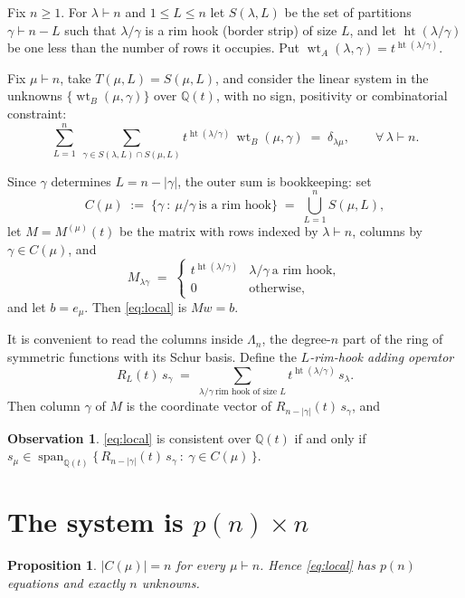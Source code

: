 \documentclass[11pt]{article}
\newtheorem{proposition}[theorem]{Proposition}
\theoremstyle{definition}
\newtheorem{observation}[theorem]{Observation}
\newcommand{\Q}{\mathbb{Q}}
\newcommand{\hgt}{\operatorname{ht}}      %
\newcommand{\wtA}{\operatorname{wt}_A}
\newcommand{\wtB}{\operatorname{wt}_B}
\newcommand{\Lam}{\Lambda}
\begin{document}
Fix $n\ge1$. For $\lambda\vdash n$ and $1\le L\le n$ let $S(\lambda,L)$ be the set of
partitions $\gamma\vdash n-L$ such that $\lambda/\gamma$ is a rim hook (border strip) of size
$L$, and let $\hgt(\lambda/\gamma)$ be one less than the number of rows it occupies. Put
$\wtA(\lambda,\gamma)=t^{\hgt(\lambda/\gamma)}$.

Fix $\mu\vdash n$, take $T(\mu,L)=S(\mu,L)$, and consider the linear system in the unknowns
$\{\wtB(\mu,\gamma)\}$ over $\Q(t)$, with no sign, positivity or combinatorial constraint:
\begin{equation}\label{eq:local}
  \sum_{L=1}^{n}\ \sum_{\gamma\in S(\lambda,L)\cap S(\mu,L)}
     t^{\hgt(\lambda/\gamma)}\,\wtB(\mu,\gamma)\;=\;\delta_{\lambda\mu},
  \qquad \forall\,\lambda\vdash n .
\end{equation}

Since $\gamma$ determines $L=n-|\gamma|$, the outer sum is bookkeeping: set
\[
  C(\mu)\;:=\;\{\gamma\ :\ \mu/\gamma\ \text{is a rim hook}\}\;=\;\bigcup_{L=1}^{n}S(\mu,L),
\]
let $M=M^{(\mu)}(t)$ be the matrix with rows indexed by $\lambda\vdash n$, columns by
$\gamma\in C(\mu)$, and
\[
  M_{\lambda\gamma}\;=\;\begin{cases} t^{\hgt(\lambda/\gamma)} & \lambda/\gamma\ \text{a rim hook},\\ 0&\text{otherwise},\end{cases}
\]
and let $b=e_\mu$. Then \eqref{eq:local} is $Mw=b$.

It is convenient to read the columns inside $\Lam_n$, the degree-$n$ part of the ring of
symmetric functions with its Schur basis. Define the \emph{$L$-rim-hook adding operator}
\[
  R_L(t)\,s_\gamma \;=\; \sum_{\lambda/\gamma\ \text{rim hook of size }L} t^{\hgt(\lambda/\gamma)}\,s_\lambda .
\]
Then column $\gamma$ of $M$ is the coordinate vector of $R_{n-|\gamma|}(t)\,s_\gamma$, and

\begin{observation}\label{obs:span}
\eqref{eq:local} is consistent over $\Q(t)$ if and only if
$s_\mu\in\operatorname{span}_{\Q(t)}\{\,R_{n-|\gamma|}(t)\,s_\gamma\ :\ \gamma\in C(\mu)\,\}$.
\end{observation}

\section{The system is $p(n)\times n$}

\begin{proposition}\label{prop:count}
$|C(\mu)|=n$ for every $\mu\vdash n$. Hence \eqref{eq:local} has $p(n)$ equations and exactly
$n$ unknowns.
\end{proposition}
\end{document}
